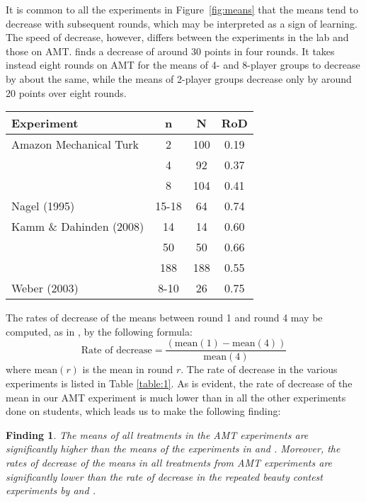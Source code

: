 \documentclass[12pt,review]{elsarticle}
\newtheorem{fdn}{Finding}
\begin{document}
It is common to all the experiments in Figure~\ref{fig:means} that the means tend to decrease with subsequent rounds, which may be interpreted as a sign of learning. The speed of decrease, however, differs between
the experiments in the lab and those on AMT. \citet{Nagel95} finds a decrease of around 30 points in four rounds. It takes instead eight rounds on AMT for the means of 4- and 8-player groups to decrease by about the same, while the means of 2-player groups decrease only by around 20 points over eight rounds.

\begin{SCtable}
\begin{tabular}{lccc}
\hline
Experiment   &  n 		&  N 	&  RoD \\
\hline
Amazon Mechanical Turk   & 2 		& 100 	& 0.19 \\
	   & 4 		& 92 	& 0.37 \\
	   & 8 		& 104 	& 0.41 \\
Nagel (1995)    & 15-18 	& 64  	& 0.74  \\
Kamm \& Dahinden (2008)  & 14 		& 14 	& 0.60  \\
	   & 50 		& 50 	& 0.66  \\
	   & 188 		& 188 	& 0.55  \\
Weber (2003)   & 8-10	& 26	& 0.75  \\
\hline
\end{tabular}
\caption{Rates of decrease in iterated p-beauty contest experiments with $p=2/3$. n = group size; N = number of subjects; RoD = rate of decrease from round 1 to round 4.}
\label{table:1}
\end{SCtable}

The rates of decrease of the means between round 1 and round 4 may be computed, as in \citet{Nagel95}, by the following formula:
\[
\text{Rate of decrease}=\frac{(\text{mean}(1)-\text{mean}(4))}{\text{mean}(4)}
\]
where $\text{mean}(r)$ is the mean in round $r$. The rate of decrease in the various experiments is listed in Table \ref{table:1}. As is evident, the rate of decrease of the mean in our AMT experiment is much lower than in all the other experiments done on students, which leads us to make the following finding:

\begin{fdn}
The means of all treatments in the AMT experiments are significantly higher than the means of the experiments in \citet{Nagel95, Kamm2008unter} and \citet{weber2003learning}. Moreover, the rates of decrease of the means in all treatments from AMT experiments are significantly lower than the rate of decrease in the repeated beauty contest experiments by \citet{Nagel95, Kamm2008unter} and \citet{weber2003learning}.
\end{fdn}
\end{document}
